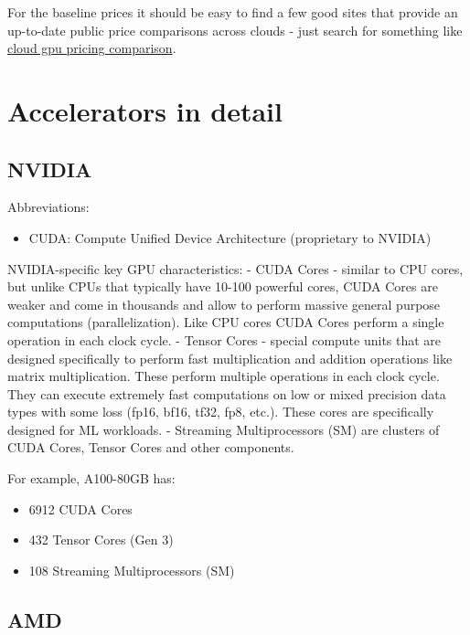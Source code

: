 \documentclass[
]{report}
\providecommand{\tightlist}{%
  \setlength{\itemsep}{0pt}\setlength{\parskip}{0pt}}\usepackage{longtable,booktabs,array}
\begin{document}
For the baseline prices it should be easy to find a few good sites that
provide an up-to-date public price comparisons across clouds - just
search for something like
\href{https://www.google.com/search?q=cloud+gpu+pricing+comparison}{cloud
gpu pricing comparison}.

\section{Accelerators in detail}\label{accelerators-in-detail}

\subsection{NVIDIA}\label{nvidia}

Abbreviations:

\begin{itemize}
\tightlist
\item
  CUDA: Compute Unified Device Architecture (proprietary to NVIDIA)
\end{itemize}

NVIDIA-specific key GPU characteristics: - CUDA Cores - similar to CPU
cores, but unlike CPUs that typically have 10-100 powerful cores, CUDA
Cores are weaker and come in thousands and allow to perform massive
general purpose computations (parallelization). Like CPU cores CUDA
Cores perform a single operation in each clock cycle. - Tensor Cores -
special compute units that are designed specifically to perform fast
multiplication and addition operations like matrix multiplication. These
perform multiple operations in each clock cycle. They can execute
extremely fast computations on low or mixed precision data types with
some loss (fp16, bf16, tf32, fp8, etc.). These cores are specifically
designed for ML workloads. - Streaming Multiprocessors (SM) are clusters
of CUDA Cores, Tensor Cores and other components.

For example, A100-80GB has:

\begin{itemize}
\tightlist
\item
  6912 CUDA Cores
\item
  432 Tensor Cores (Gen 3)
\item
  108 Streaming Multiprocessors (SM)
\end{itemize}

\subsection{AMD}\label{amd}
\end{document}
